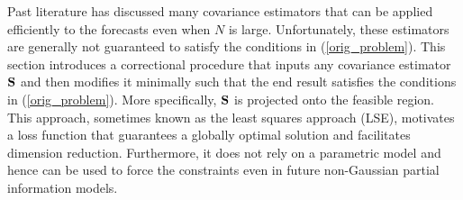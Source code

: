 \documentclass[11pt]{article}
\newcommand{\COR}{\text{COR}}
\theoremstyle{definition}
\theoremstyle{definition}
\def\bSigma{{\bf \Sigma}}
\def\SS{{\bf S}}
\begin{document}


Past literature has discussed many covariance estimators that can be applied efficiently to the forecasts even when $N$ is large. Unfortunately, these estimators are generally not guaranteed to satisfy the conditions in (\ref{orig_problem}). This section introduces a correctional procedure that inputs any covariance estimator $\SS$ and then modifies it minimally such that the end result satisfies the conditions in (\ref{orig_problem}). More specifically, $\SS$ is projected onto the feasible region. 
 This approach, sometimes known as the least squares approach (LSE), 
motivates a loss function that guarantees a globally optimal solution and facilitates dimension reduction. Furthermore, it does not rely on a parametric model and hence can be used to force the constraints even in future non-Gaussian partial information models. 
\end{document}
